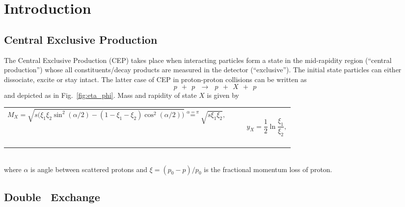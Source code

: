 

\chapter{Introduction}\label{chap:introduction}

\section{Central Exclusive Production}
The Central Exclusive Production (CEP) takes place when interacting particles form a state in the mid-rapidity region (``central production'') whose all constituents/decay products are measured in the detector (``exclusive''). The initial state particles can either dissociate, excite or stay intact. The latter case of CEP in proton-proton collisions can be written as
\begin{equation}\label{eq:cep}%
p~~+~~p~~~\rightarrow~~~p~~+~~X~~+~~p
\end{equation}
and depicted as in Fig.~\ref{fig:eta_phi}. Mass and rapidity of state $X$ is given by\\[-10pt]
\begin{tabulary}{\textwidth}{CCR}
\begin{equation}\label{eq:mass_X}
M_{X} = \sqrt{s\Big(\xi_{1}\xi_{2}\sin^{2}{(\alpha/2)}-(1-\xi_{1}-\xi_{2})\cos^{2}{(\alpha/2)}\Big)} \stackrel{\alpha=\pi}{=} \sqrt{s\xi_{1}\xi_{2}},
\end{equation}~~~~~~~~~~~~~~~~ & ~~ & ~~~~~~
\begin{equation}\label{eq:rapidity_X}
y_{X} = \frac{1}{2}\ln{\frac{\xi_{1}}{\xi_{2}}},
\end{equation}~~~~~~~~
\end{tabulary}\\[-10pt]
where $\alpha$ is angle between scattered protons and $\xi=(p_{0}-p)/p_{0}$ is the fractional momentum loss of proton.\vspace{-5pt}

\section{Double \Pomeron\  Exchange}\label{sec:DPE}

